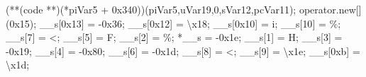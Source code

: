 \documentclass[
]{article}
\newenvironment{Shaded}{}{}
\newcommand{\BaseNTok}[1]{\textcolor[rgb]{0.25,0.63,0.44}{#1}}
\newcommand{\CharTok}[1]{\textcolor[rgb]{0.25,0.44,0.63}{#1}}
\newcommand{\DecValTok}[1]{\textcolor[rgb]{0.25,0.63,0.44}{#1}}
\newcommand{\NormalTok}[1]{#1}
\newcommand{\OperatorTok}[1]{\textcolor[rgb]{0.40,0.40,0.40}{#1}}
\newcommand{\SpecialCharTok}[1]{\textcolor[rgb]{0.25,0.44,0.63}{#1}}
\begin{document}
\begin{Shaded}
\begin{Highlighting}[]
      \OperatorTok{(**(}\NormalTok{code }\OperatorTok{**)(*}\NormalTok{piVar5 }\OperatorTok{+} \BaseNTok{0x340}\OperatorTok{))(}\NormalTok{piVar5}\OperatorTok{,}\NormalTok{uVar19}\OperatorTok{,}\DecValTok{0}\OperatorTok{,}\NormalTok{sVar12}\OperatorTok{,}\NormalTok{pcVar11}\OperatorTok{);}
\NormalTok{      operator}\OperatorTok{.}\NormalTok{new}\OperatorTok{[](}\BaseNTok{0x15}\OperatorTok{);}
\NormalTok{      \_\_s}\OperatorTok{[}\BaseNTok{0x13}\OperatorTok{]} \OperatorTok{=} \OperatorTok{{-}}\BaseNTok{0x36}\OperatorTok{;}
\NormalTok{      \_\_s}\OperatorTok{[}\BaseNTok{0x12}\OperatorTok{]} \OperatorTok{=} \CharTok{\textquotesingle{}}\SpecialCharTok{\textbackslash{}x18}\CharTok{\textquotesingle{}}\OperatorTok{;}
\NormalTok{      \_\_s}\OperatorTok{[}\BaseNTok{0x10}\OperatorTok{]} \OperatorTok{=} \CharTok{\textquotesingle{}i\textquotesingle{}}\OperatorTok{;}
\NormalTok{      \_\_s}\OperatorTok{[}\DecValTok{10}\OperatorTok{]} \OperatorTok{=} \CharTok{\textquotesingle{}\%\textquotesingle{}}\OperatorTok{;}
\NormalTok{      \_\_s}\OperatorTok{[}\DecValTok{7}\OperatorTok{]} \OperatorTok{=} \CharTok{\textquotesingle{}\textless{}\textquotesingle{}}\OperatorTok{;}
\NormalTok{      \_\_s}\OperatorTok{[}\DecValTok{5}\OperatorTok{]} \OperatorTok{=} \CharTok{\textquotesingle{}F\textquotesingle{}}\OperatorTok{;}
\NormalTok{      \_\_s}\OperatorTok{[}\DecValTok{2}\OperatorTok{]} \OperatorTok{=} \CharTok{\textquotesingle{}\%\textquotesingle{}}\OperatorTok{;}
      \OperatorTok{*}\NormalTok{\_\_s }\OperatorTok{=} \OperatorTok{{-}}\BaseNTok{0x1e}\OperatorTok{;}
\NormalTok{      \_\_s}\OperatorTok{[}\DecValTok{1}\OperatorTok{]} \OperatorTok{=} \CharTok{\textquotesingle{}H\textquotesingle{}}\OperatorTok{;}
\NormalTok{      \_\_s}\OperatorTok{[}\DecValTok{3}\OperatorTok{]} \OperatorTok{=} \OperatorTok{{-}}\BaseNTok{0x19}\OperatorTok{;}
\NormalTok{      \_\_s}\OperatorTok{[}\DecValTok{4}\OperatorTok{]} \OperatorTok{=} \OperatorTok{{-}}\BaseNTok{0x80}\OperatorTok{;}
\NormalTok{      \_\_s}\OperatorTok{[}\DecValTok{6}\OperatorTok{]} \OperatorTok{=} \OperatorTok{{-}}\BaseNTok{0x1d}\OperatorTok{;}
\NormalTok{      \_\_s}\OperatorTok{[}\DecValTok{8}\OperatorTok{]} \OperatorTok{=} \CharTok{\textquotesingle{}\textless{}\textquotesingle{}}\OperatorTok{;}
\NormalTok{      \_\_s}\OperatorTok{[}\DecValTok{9}\OperatorTok{]} \OperatorTok{=} \CharTok{\textquotesingle{}}\SpecialCharTok{\textbackslash{}x1e}\CharTok{\textquotesingle{}}\OperatorTok{;}
\NormalTok{      \_\_s}\OperatorTok{[}\BaseNTok{0xb}\OperatorTok{]} \OperatorTok{=} \CharTok{\textquotesingle{}}\SpecialCharTok{\textbackslash{}x1d}\CharTok{\textquotesingle{}}\OperatorTok{;}

\end{Highlighting}
\end{Shaded}
\end{document}

